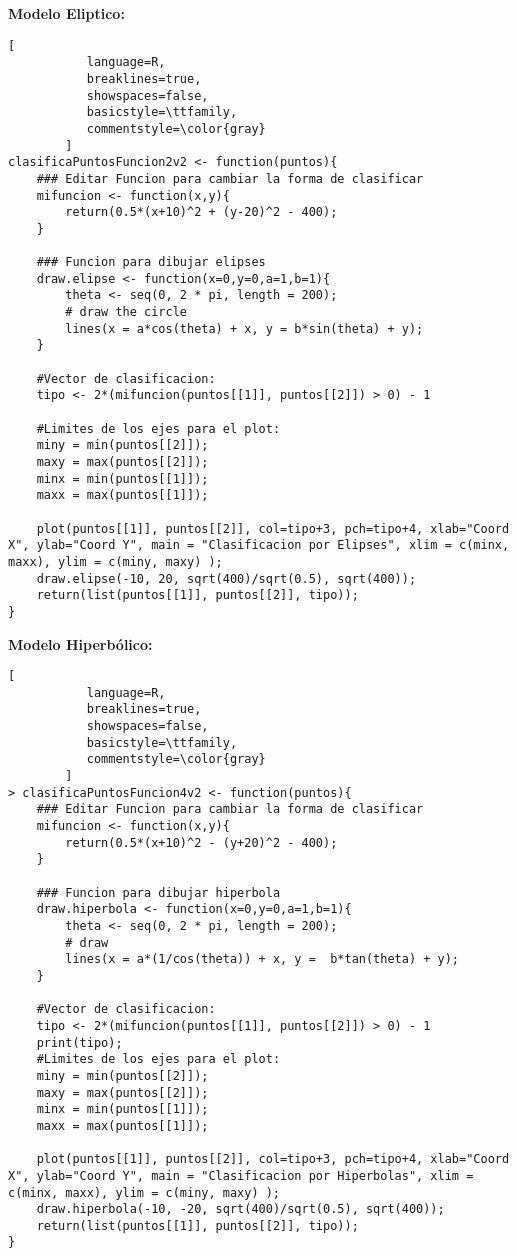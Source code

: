 \documentclass[11pt,fleqn]{book} %
\begin{document}
\textbf{Modelo Eliptico:}
\begin{lstlisting}[
           language=R,
           breaklines=true,
           showspaces=false,
           basicstyle=\ttfamily,
           commentstyle=\color{gray}
        ]
clasificaPuntosFuncion2v2 <- function(puntos){
    ### Editar Funcion para cambiar la forma de clasificar
    mifuncion <- function(x,y){
        return(0.5*(x+10)^2 + (y-20)^2 - 400);
    }
    
    ### Funcion para dibujar elipses
    draw.elipse <- function(x=0,y=0,a=1,b=1){
        theta <- seq(0, 2 * pi, length = 200);
        # draw the circle
        lines(x = a*cos(theta) + x, y = b*sin(theta) + y);
    }
    
    #Vector de clasificacion:
    tipo <- 2*(mifuncion(puntos[[1]], puntos[[2]]) > 0) - 1
    
    #Limites de los ejes para el plot:
    miny = min(puntos[[2]]);
    maxy = max(puntos[[2]]);
    minx = min(puntos[[1]]);
    maxx = max(puntos[[1]]);
    
    plot(puntos[[1]], puntos[[2]], col=tipo+3, pch=tipo+4, xlab="Coord X", ylab="Coord Y", main = "Clasificacion por Elipses", xlim = c(minx, maxx), ylim = c(miny, maxy) );
    draw.elipse(-10, 20, sqrt(400)/sqrt(0.5), sqrt(400));
    return(list(puntos[[1]], puntos[[2]], tipo));
}
\end{lstlisting}

\textbf{Modelo Hiperbólico:}
\begin{lstlisting}[
           language=R,
           breaklines=true,
           showspaces=false,
           basicstyle=\ttfamily,
           commentstyle=\color{gray}
        ]
> clasificaPuntosFuncion4v2 <- function(puntos){
    ### Editar Funcion para cambiar la forma de clasificar
    mifuncion <- function(x,y){
        return(0.5*(x+10)^2 - (y+20)^2 - 400);
    }
    
    ### Funcion para dibujar hiperbola
    draw.hiperbola <- function(x=0,y=0,a=1,b=1){
        theta <- seq(0, 2 * pi, length = 200);
        # draw
        lines(x = a*(1/cos(theta)) + x, y =  b*tan(theta) + y);
    }
    
    #Vector de clasificacion:
    tipo <- 2*(mifuncion(puntos[[1]], puntos[[2]]) > 0) - 1
    print(tipo);
    #Limites de los ejes para el plot:
    miny = min(puntos[[2]]);
    maxy = max(puntos[[2]]);
    minx = min(puntos[[1]]);
    maxx = max(puntos[[1]]);
    
    plot(puntos[[1]], puntos[[2]], col=tipo+3, pch=tipo+4, xlab="Coord X", ylab="Coord Y", main = "Clasificacion por Hiperbolas", xlim = c(minx, maxx), ylim = c(miny, maxy) );
    draw.hiperbola(-10, -20, sqrt(400)/sqrt(0.5), sqrt(400));
    return(list(puntos[[1]], puntos[[2]], tipo));
}
\end{lstlisting}
\end{document}
